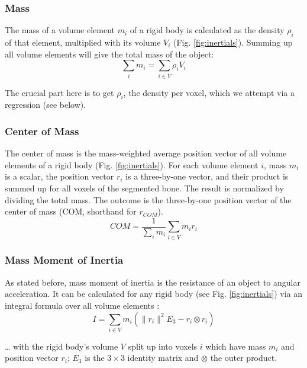\subsubsection{Mass}
\label{sec:orgc67bdd5}
The mass of a volume element \(m_{i}\) of a rigid body is calculated as the density \(\rho_{i}\) of that element, multiplied with its volume \(V_{i}\) (Fig. \ref{fig:inertials}).
Summing up all volume elements will give the total mass of the object:
\begin{equation}\label{eqn:mass}
\sum_{i} m_{i} = \sum\limits_{i \in V} \rho_{i} V_{i}
\end{equation}

The crucial part here is to get \(\rho_{i}\), the density per voxel, which we attempt via a regression (see below).


\subsubsection{Center of Mass}
\label{sec:orgb72de19}
The center of mass is the mass-weighted average position vector of all volume elements of a rigid body (Fig. \ref{fig:inertials}).
For each volume element \(i\), mass \(m_{i}\) is a scalar, the position vector \(r_{i}\) is a three-by-one vector, and their product is summed up for all voxels of the segmented bone.
The result is normalized by dividing the total mass.
The outcome is the three-by-one position vector of the center of mass (COM, shorthand for \(r_{COM}\)).
\begin{equation}\label{eqn:com}
 COM = \frac{1}{\sum_i m_{i}} \sum\limits_{i \in V} m_{i} r_{i}
\end{equation}


\subsubsection{Mass Moment of Inertia}
\label{sec:org04c9f63}
As stated before, mass moment of inertia is the resistance of an object to angular acceleration.
It can be calculated for any rigid body (see Fig. \ref{fig:inertials}) via an integral formula over all volume elements \citep{WikipediaMOI}:
\begin{equation}\label{eqn:mmoi}
 I = \sum\limits_{i \in V} m_{i} \left( \lVert r_{i} \rVert ^2 E_3 - r_{i} \otimes r_{i} \right)
\end{equation}

\ldots{} with the rigid body's volume \(V\) split up into voxels \(i\) which have mass \(m_i\) and position vector \(r_{i}\); \(E_{3}\) is the \(3\times 3\) identity matrix and \(\otimes\) the outer product.

